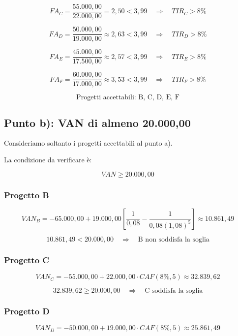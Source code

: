 \[
    FA_C
    =
    \frac{55.000{,}00}{22.000{,}00}
    =2{,}50<3{,}99
    \quad\Rightarrow\quad
    TIR_C>8\%
\]

\[
    FA_D
    =
    \frac{50.000{,}00}{19.000{,}00}
    \approx 2{,}63<3{,}99
    \quad\Rightarrow\quad
    TIR_D>8\%
\]

\[
    FA_E
    =
    \frac{45.000{,}00}{17.500{,}00}
    \approx 2{,}57<3{,}99
    \quad\Rightarrow\quad
    TIR_E>8\%
\]

\[
    FA_F
    =
    \frac{60.000{,}00}{17.000{,}00}
    \approx 3{,}53<3{,}99
    \quad\Rightarrow\quad
    TIR_F>8\%
\]

\[
    \boxed{\text{Progetti accettabili: B, C, D, E, F}}
\]

\subsection{Punto b): VAN di almeno 20.000,00}

\noindent Consideriamo soltanto i progetti accettabili al punto a).

\noindent La condizione da verificare è:

\[
    VAN\geq 20.000{,}00
\]

\subsubsection*{Progetto B}

\[
    VAN_B
    =
    -65.000{,}00+
    19.000{,}00
    \left[
        \frac{1}{0{,}08}
        -
        \frac{1}{0{,}08(1{,}08)^5}
    \right]
    \approx 10.861{,}49
\]

\[
    10.861{,}49<20.000{,}00
    \quad\Rightarrow\quad
    \text{B non soddisfa la soglia}
\]

\subsubsection*{Progetto C}

\[
    VAN_C
    =
    -55.000{,}00+
    22.000{,}00\cdot CAF(8\%,5)
    \approx 32.839{,}62
\]

\[
    32.839{,}62\geq20.000{,}00
    \quad\Rightarrow\quad
    \text{C soddisfa la soglia}
\]

\subsubsection*{Progetto D}

\[
    VAN_D
    =
    -50.000{,}00+
    19.000{,}00\cdot CAF(8\%,5)
    \approx 25.861{,}49
\]

